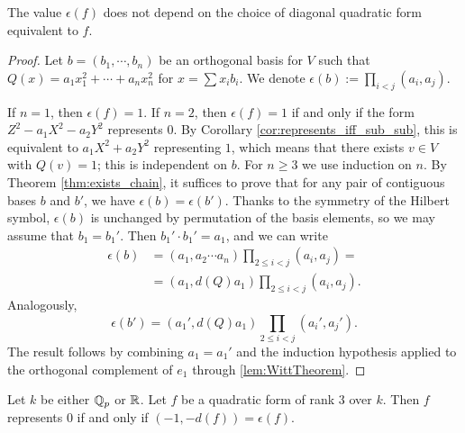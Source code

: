 \begin{lemma}\label{lem:HM_inv_well_defined}
\leanok
The value $\epsilon(f)$ does not depend on the choice of diagonal quadratic form equivalent to $f$.
\end{lemma}
\begin{proof}
\leanok
Let $b = (b_1, \cdots, b_n)$ be an orthogonal basis for $V$ such that $Q(x) = a_1 x_1^2 + \cdots + a_n x_n^2$ for $x = \sum x_i b_i$. We denote  $\epsilon(b) := \prod_{i < j}(a_i, a_j)$.

If $n=1$, then $\epsilon(f) = 1$. If $n=2$, then $\epsilon(f) = 1$ if and only if the form $Z^2 - a_1 X^2 - a_2 Y^2$ represents $0$. By Corollary \ref{cor:represents_iff_sub_sub}, this is equivalent to $a_1 X^2 + a_2 Y^2$ representing $1$, which means that there exists $v \in V$ with $Q(v) = 1$; this is independent on $b$.
For $n \ge 3$ we use induction on $n$. By Theorem \ref{thm:exists_chain}, it suffices to prove that for any pair of contiguous bases $b$ and $b'$, we have $\epsilon(b) = \epsilon(b')$.
Thanks to the symmetry of the Hilbert symbol, $\epsilon(b)$ is unchanged by permutation of the basis elements, so we may assume that $b_1 = b_1'$.
Then $b_1' \cdot b_1' = a_1$, and we can write
\begin{align*}
	\epsilon(b) &= (a_1, a_2 \cdots a_n) \prod_{2 \le i < j} (a_i, a_j) = \\
	&= (a_1, d(Q) a_1) \prod_{2 \le i < j} (a_i, a_j).
\end{align*}
Analogously, \[\epsilon(b') = (a_1', d(Q) a_1) \prod_{2 \le i < j} (a_i', a_j'). \]
The result follows by combining $a_1 = a_1'$ and the induction hypothesis applied to the orthogonal complement of $e_1$ through \ref{lem:WittTheorem}.
\end{proof}

\begin{lemma}\label{lem:represents_zero_iff_rk_3}
\leanok
{}
Let $k$ be either $\mathbb{Q}_p$ or $\mathbb{R}$. Let $f$ be a quadratic form of rank $3$ over $k$. Then $f$ represents $0$ if and only if $(-1, -d(f)) = \epsilon(f)$.
\end{lemma}

